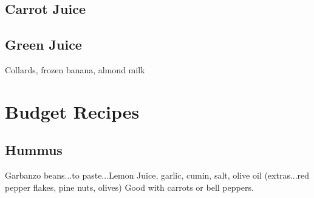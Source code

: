 \documentclass{article}
\begin{document}
\subsection*{Carrot Juice} 

\subsection*{Green Juice}
Collards, frozen banana, almond milk 

\section*{Budget Recipes}

\subsection*{Hummus}
Garbanzo beans...to paste...Lemon Juice, garlic, cumin, salt, olive oil (extras...red pepper flakes, pine nuts, olives)
Good with carrots or bell peppers.
\end{document}
